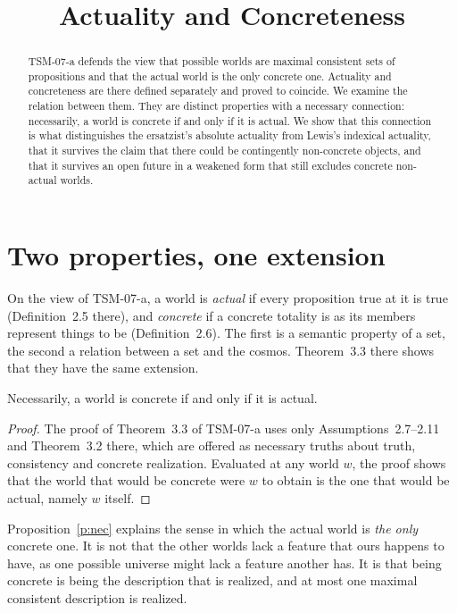 \documentclass{situationist-preprint}
\title{Actuality and Concreteness}
\begin{document}
\maketitle

\begin{abstract}
TSM-07-a defends the view that possible worlds are maximal consistent sets of propositions and that the actual world is the only concrete one. Actuality and concreteness are there defined separately and proved to coincide. We examine the relation between them. They are distinct properties with a necessary connection: necessarily, a world is concrete if and only if it is actual. We show that this connection is what distinguishes the ersatzist's absolute actuality from Lewis's indexical actuality, that it survives the claim that there could be contingently non-concrete objects, and that it survives an open future in a weakened form that still excludes concrete non-actual worlds.
\end{abstract}

\section{Two properties, one extension}

On the view of TSM-07-a, a world is \emph{actual} if every proposition true at it is true (Definition~2.5 there), and \emph{concrete} if a concrete totality is as its members represent things to be (Definition~2.6). The first is a semantic property of a set, the second a relation between a set and the cosmos. Theorem~3.3 there shows that they have the same extension.

\begin{proposition}\label{p:nec}
Necessarily, a world is concrete if and only if it is actual.
\end{proposition}

\begin{proof}
The proof of Theorem~3.3 of TSM-07-a uses only Assumptions~2.7--2.11 and Theorem~3.2 there, which are offered as necessary truths about truth, consistency and concrete realization. Evaluated at any world $w$, the proof shows that the world that would be concrete were $w$ to obtain is the one that would be actual, namely $w$ itself.
\end{proof}

Proposition~\ref{p:nec} explains the sense in which the actual world is \emph{the only} concrete one. It is not that the other worlds lack a feature that ours happens to have, as one possible universe might lack a feature another has. It is that being concrete is being the description that is realized, and at most one maximal consistent description is realized.
\end{document}
